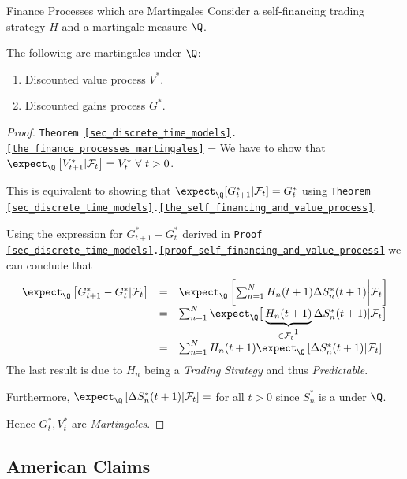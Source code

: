 \documentclass[11pt,a4paper]{article}
\begin{document}
  \begin{theorem}{Finance Processes which are Martingales}\label{the_finance_processes_martingales}
    Consider a self-financing trading strategy $H$ and a martingale measure $\Q$.
    \par The following are martingales under $\Q$:
    \begin{enumerate}
      \item Discounted value process $V^*$.
      \item Discounted gains process $G^*$.
    \end{enumerate}
  \end{theorem}

  \begin{proof}{\texttt{Theorem \ref{sec_discrete_time_models}.\ref{the_finance_processes_martingales}}}
    \everymath={\displaystyle}
    We have to show that $\expect_\Q\left[V_{t+1}^*|\mathcal{F}_t\right]=V_t^*\ \forall\ t>0$.
    \par This is equivalent to showing that $\expect_\Q[G_{t+1}^*|\mathcal{F}_t]=G_t^*$ using \texttt{Theorem \ref{sec_discrete_time_models}.\ref{the_self_financing_and_value_process}}.
    \par Using the expression for $G_{t+1}^*-G_t^*$ derived in \texttt{Proof \ref{sec_discrete_time_models}.\ref{proof_self_financing_and_value_process}} we can conclude that
    \[\begin{array}{rcl}
      \expect_\Q\left[G_{t+1}^*-G_t^*|\mathcal{F}_t\right]&=&\expect_\Q\left[\sum_{n=1}^NH_n(t+1)\Delta S_n^*(t+1)\bigg|\mathcal{F}_t\right]\\
      &=&\sum_{n=1}^N\expect_\Q\big[\underbrace{H_n(t+1)}_{\in\mathcal{F}_t\footnotemark}\Delta S_n^*(t+1)|\mathcal{F}_t\big]\\
      &=&\sum_{n=1}^NH_n(t+1)\expect_\Q\left[\Delta S_n^*(t+1)|\mathcal{F}_t\right]
    \end{array}\]
    The last result is due to $H_n$ being a \textit{Trading Strategy} and thus \textit{Predictable}.
    \par Furthermore, $\expect_\Q\left[\Delta S_n^*(t+1)|\mathcal{F}_t\right]=$ for all $t>0$ since $S_n^*$ is a under $\Q$.
    \par Hence $G_t^*,V_t^*$ are \textit{Martingales}.\proved
  \end{proof}

\subsection{American Claims}
\end{document}
